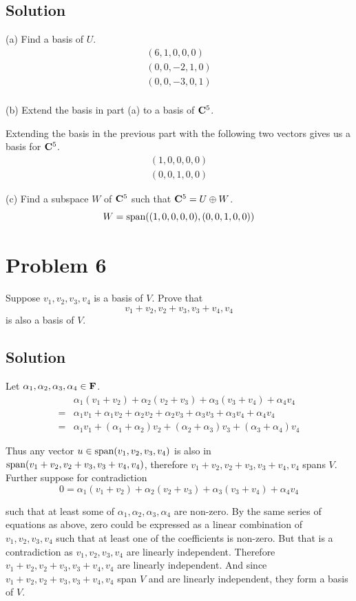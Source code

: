 \documentclass{article}
\begin{document}
\subsection*{Solution}
(a) Find a basis of $U$.
\begin{align*}
(6, 1, 0, 0, 0)\\
(0, 0, -2, 1, 0)\\
(0, 0, -3, 0, 1)\\
\end{align*}

(b) Extend the basis in part (a) to a basis of $\mathbf{C}^5$.

Extending the basis in the previous part with the following two vectors gives us a basis for $\mathbf{C}^5$.
\begin{align*}
(1, 0, 0, 0, 0)\\
(0, 0, 1, 0, 0)
\end{align*}

(c) Find a subspace $W$ of $\mathbf{C}^5$ such that $\mathbf{C}^5=U\oplus W$.
\[W=\text{span}((1, 0, 0, 0, 0), (0, 0, 1, 0, 0))\]

\section*{Problem 6}
Suppose $v_1, v_2, v_3, v_4$ is a basis of $V$. Prove that
\[v_1+v_2, v_2+v_3, v_3+v_4, v_4\]
is also a basis of $V$.

\subsection*{Solution}
Let $\alpha_1, \alpha_2, \alpha_3, \alpha_4\in\mathbf{F}$.
\begin{align*}
    &\alpha_1(v_1+v_2) + \alpha_2(v_2+v_3) + \alpha_3(v_3+v_4) + \alpha_4 v_4\\
    =&\alpha_1 v_1 + \alpha_1 v_2 + \alpha_2 v_2 + \alpha_2 v_3 + \alpha_3 v_3 + \alpha_3 v_4 + \alpha_4 v_4\\
    =&\alpha_1 v_1 + (\alpha_1+\alpha_2)v_2 + (\alpha_2+\alpha_3)v_3 + (\alpha_3+\alpha_4)v_4
\end{align*}

Thus any vector $u\in\text{span}(v_1, v_2, v_3, v_4)$ is also in $\text{span}(v_1+v_2, v_2+v_3, v_3+v_4, v_4)$, therefore $v_1+v_2, v_2+v_3, v_3+v_4, v_4$ spans $V$. Further suppose for contradiction
\[0=\alpha_1(v_1+v_2) + \alpha_2(v_2+v_3) + \alpha_3(v_3+v_4) + \alpha_4 v_4\]

such that at least some of $\alpha_1, \alpha_2, \alpha_3, \alpha_4$ are non-zero. By the same series of equations as above, zero could be expressed as a linear combination of $v_1, v_2, v_3, v_4$ such that at least one of the coefficients is non-zero. But that is a contradiction as $v_1, v_2, v_3, v_4$ are linearly independent. Therefore $v_1+v_2, v_2+v_3, v_3+v_4, v_4$ are linearly independent. And since $v_1+v_2, v_2+v_3, v_3+v_4, v_4$ span $V$ and are linearly independent, they form a basis of $V$.
\end{document}
